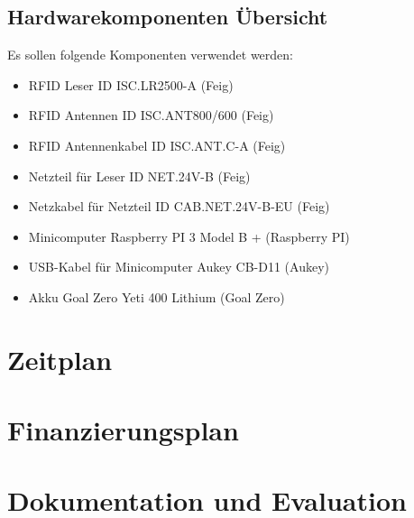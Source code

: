 \section{Hardwarekomponenten Übersicht}
Es sollen folgende Komponenten verwendet werden:
\begin{itemize}
	\item RFID Leser ID ISC.LR2500-A  (Feig)
	\item RFID Antennen ID ISC.ANT800/600 (Feig)
	\item RFID Antennenkabel ID ISC.ANT.C-A (Feig)
	\item Netzteil für Leser ID NET.24V-B (Feig)
	\item Netzkabel für Netzteil ID CAB.NET.24V-B-EU  (Feig)
	\item Minicomputer Raspberry PI 3 Model B + (Raspberry PI)
	\item USB-Kabel für Minicomputer Aukey CB-D11 (Aukey)
	\item Akku Goal Zero Yeti 400 Lithium (Goal Zero)
\end{itemize}

\chapter{Zeitplan}

\chapter{Finanzierungsplan}

\chapter{Dokumentation und Evaluation}